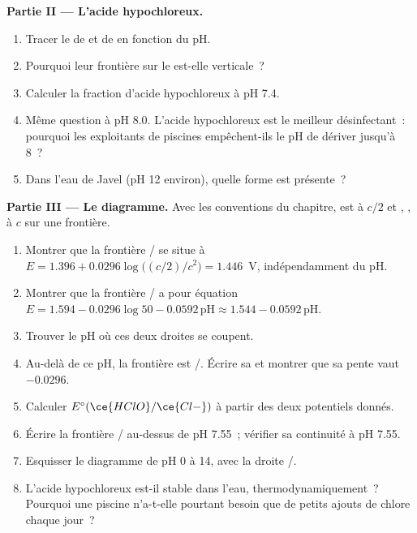 \begin{problem}
\medskip
\noindent\textbf{Partie II --- L'acide hypochloreux.}
\begin{enumerate}[resume]
  \item Tracer le  de  et de 
        en fonction du pH.
  \item Pourquoi leur frontière sur le  est-elle
        verticale~?
  \item Calculer la fraction d'acide hypochloreux à pH 7.4.
  \item Même question à pH 8.0. L'acide hypochloreux est le meilleur
        désinfectant~: pourquoi les exploitants de piscines empêchent-ils
        le pH de dériver jusqu'à 8~?
  \item Dans l'eau de Javel (pH 12 environ), quelle forme est présente~?
\end{enumerate}

\medskip
\noindent\textbf{Partie III --- Le diagramme.}
Avec les conventions du chapitre,  est à $c/2$ et ,
,  à $c$ sur une frontière.
\begin{enumerate}[resume]
  \item Montrer que la frontière / se situe à $E = 1.396 +
        0.0296\log\bigl((c/2)/c^2\bigr) = 1.446$~V, indépendamment du pH.
  \item Montrer que la frontière / a pour équation
        $E = 1.594 -
        0.0296\log 50 - 0.0592\,\mathrm{pH} \approx 1.544 -
        0.0592\,\mathrm{pH}$.
  \item Trouver le pH où ces deux droites se coupent.
  \item Au-delà de ce pH, la frontière est /. Écrire sa
         et montrer que sa pente vaut $-0.0296$.
  \item Calculer $E^\circ(\ce{HClO}/\ce{Cl-})$ à partir des deux
        potentiels donnés.
  \item Écrire la frontière / au-dessus de pH 7.55~;
        vérifier sa continuité à pH 7.55.
  \item Esquisser le diagramme de pH 0 à 14, avec la droite
        /.
  \item L'acide hypochloreux est-il stable dans l'eau,
        thermodynamiquement~? Pourquoi une piscine n'a-t-elle pourtant
        besoin que de petits ajouts de chlore chaque jour~?
\end{enumerate}


\end{problem}
